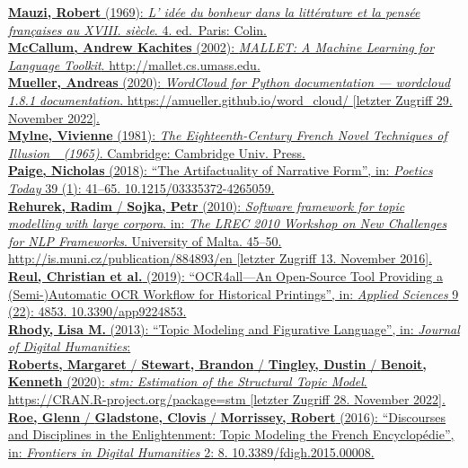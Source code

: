 \documentclass[
  12pt,
  letterpaper,
  DIV=11,
  numbers=noendperiod]{scrreprt}
\begin{document}
\href{https://www.zotero.org/google-docs/?fqBRoB}{\textbf{Mauzi, Robert}
(1969): \emph{L' idée du bonheur dans la littérature et la pensée
françaises au XVIII. siècle}. 4. ed.~Paris: Colin.}\\
\href{https://www.zotero.org/google-docs/?fqBRoB}{\textbf{McCallum,
Andrew Kachites} (2002): \emph{MALLET: A Machine Learning for Language
Toolkit}. http://mallet.cs.umass.edu.}\\
\href{https://www.zotero.org/google-docs/?fqBRoB}{\textbf{Mueller,
Andreas} (2020): \emph{WordCloud for Python documentation --- wordcloud
1.8.1 documentation}. https://amueller.github.io/word\_cloud/ {[}letzter
Zugriff 29. November 2022{]}.}\\
\href{https://www.zotero.org/google-docs/?fqBRoB}{\textbf{Mylne,
Vivienne} (1981): \emph{The Eighteenth-Century French Novel Techniques
of Illusion \_(1965)}. Cambridge: Cambridge Univ. Press.}\\
\href{https://www.zotero.org/google-docs/?fqBRoB}{\textbf{Paige,
Nicholas} (2018): ``The Artifactuality of Narrative Form'', in:
\emph{Poetics Today} 39 (1): 41--65. 10.1215/03335372-4265059.}\\
\href{https://www.zotero.org/google-docs/?fqBRoB}{\textbf{Rehurek,
Radim} / \textbf{Sojka, Petr} (2010): \emph{Software framework for topic
modelling with large corpora}. in: \emph{The LREC 2010 Workshop on New
Challenges for NLP Frameworks}. University of Malta. 45--50.
http://is.muni.cz/publication/884893/en {[}letzter Zugriff 13. November
2016{]}.}\\
\href{https://www.zotero.org/google-docs/?fqBRoB}{\textbf{Reul,
Christian et al.} (2019): ``OCR4all---An Open-Source Tool Providing a
(Semi-)Automatic OCR Workflow for Historical Printings'', in:
\emph{Applied Sciences} 9 (22): 4853. 10.3390/app9224853.}\\
\href{https://www.zotero.org/google-docs/?fqBRoB}{\textbf{Rhody, Lisa
M.} (2013): ``Topic Modeling and Figurative Language'', in:
\emph{Journal of Digital Humanities}:}\\
\href{https://www.zotero.org/google-docs/?fqBRoB}{\textbf{Roberts,
Margaret} / \textbf{Stewart, Brandon} / \textbf{Tingley, Dustin} /
\textbf{Benoit, Kenneth} (2020): \emph{stm: Estimation of the Structural
Topic Model}. https://CRAN.R-project.org/package=stm {[}letzter Zugriff
28. November 2022{]}.}\\
\href{https://www.zotero.org/google-docs/?fqBRoB}{\textbf{Roe, Glenn} /
\textbf{Gladstone, Clovis} / \textbf{Morrissey, Robert} (2016):
``Discourses and Disciplines in the Enlightenment: Topic Modeling the
French Encyclopédie'', in: \emph{Frontiers in Digital Humanities} 2: 8.
10.3389/fdigh.2015.00008.}\\
\end{document}
